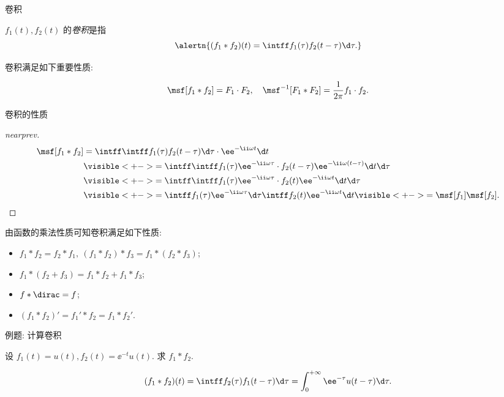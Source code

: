 \begin{frame}{卷积}
	\onslide<+->
	\begin{definition}
		$f_1(t),f_2(t)$ 的\emph{卷积}是指
	\[
		\alertn{(f_1\ast f_2)(t)=\intff  f_1(\tau)f_2(t-\tau)\d \tau.}
	\]
	\end{definition}
	\onslide<+->
	卷积满足如下重要性质:
	\onslide<+->
	\begin{theorem*}[][卷积定理]
	\[
		\msf[f_1\ast f_2]=F_1\cdot F_2,\quad
	\msf^{-1}[F_1\ast F_2]=\frac1{2\pi}f_1\cdot f_2.
	\]
	\bigdel
	\end{theorem*}
\end{frame}


\begin{frame}{卷积的性质}\small
	\onslide<+->
	\begin{proof}[nearprev]
		\bigdel\bigdel
		\begin{align*}
			\msf[f_1\ast f_2]&=\intff \intff f_1(\tau)f_2(t-\tau)\d \tau \cdot \ee^{-\ii \omega t}\d t\\
			&\visible<+->{=\intff \intff f_1(\tau)\ee^{-\ii \omega \tau}\cdot f_2(t-\tau)\ee^{-\ii \omega (t-\tau)}\d t\d \tau}\\
			&\visible<+->{=\intff \intff f_1(\tau)\ee^{-\ii \omega \tau}\cdot f_2(t)\ee^{-\ii \omega t}\d t\d \tau}\\
			&\visible<+->{=\intff f_1(\tau)\ee^{-\ii \omega \tau}\d\tau\intff f_2(t)\ee^{-\ii \omega t}\d t}\visible<+->{=\msf[f_1]\msf[f_2].\qedhere}
		\end{align*}
	\end{proof}
	\onslide<+->
	由函数的乘法性质可知卷积满足如下性质:
	\begin{itemize}\bf
		\item $f_1\ast f_2=f_2\ast f_1,\ (f_1\ast f_2)\ast f_3=f_1\ast(f_2\ast f_3)$;
		\item $f_1\ast(f_2+f_3)=f_1\ast f_2+f_1\ast f_3$;
		\item $f\ast\dirac=f$;
		\item $(f_1\ast f_2)'=f_1'\ast f_2=f_1\ast f_2'$.
	\end{itemize}
\end{frame}


\begin{frame}{例题: 计算卷积}
	\onslide<+->
	\begin{example}[nearnext]
		设 $f_1(t)=u(t),f_2(t)=\ee^{-t}u(t)$. 求 $f_1\ast f_2$.
	\end{example}
	\onslide<+->
	\begin{solution}[nearprev]
			\[
		(f_1\ast f_2)(t)=\intff  f_2(\tau)f_1(t-\tau)\d \tau=\int_0^{+\infty} \ee^{-\tau}u(t-\tau)\d \tau.
	\]
		\onslide<+->{故 $(f_1\ast f_2)(t)=(1-\ee^{-t})u(t)$.
		}
	\end{solution}
\end{frame}


